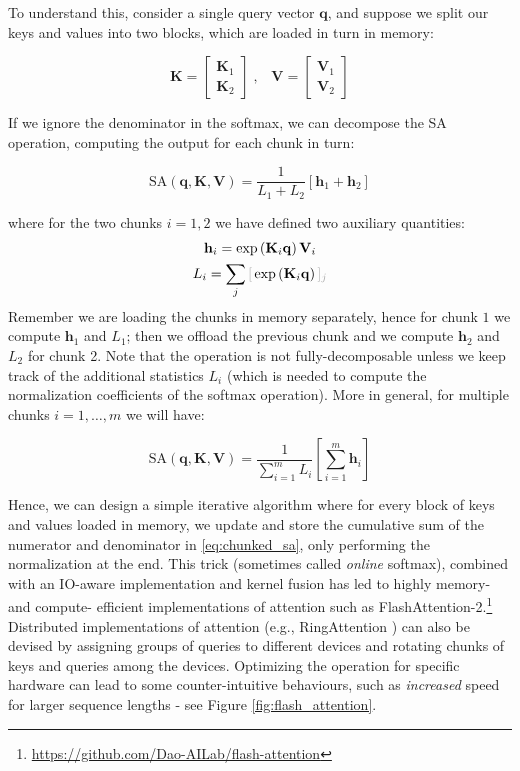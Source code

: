 To understand this, consider a single query vector $\mathbf{q}$, and suppose we split our keys and values into two blocks, which are loaded in turn in memory:

\begin{equation}
\mathbf{K} = \begin{bmatrix}\mathbf{K}_1 \\ \mathbf{K}_2 \end{bmatrix} \;,\;\;\; \mathbf{V} = \begin{bmatrix}\mathbf{V}_1 \\ \mathbf{V}_2 \end{bmatrix}
\end{equation}

If we ignore the denominator in the softmax, we can decompose the SA operation, computing the output for each chunk in turn:

\begin{equation}
\text{SA}(\mathbf{q}, \mathbf{K}, \mathbf{V}) = \frac{1}{L_1 + L_2} \left[ \mathbf{h}_1 + \mathbf{h}_2 \right]
\label{eq:attention_two_chunks}
\end{equation}

where for the two chunks $i=1,2$ we have defined two auxiliary quantities:
%
\begin{gather}
\mathbf{h}_i = \exp\left( \mathbf{K}_i\mathbf{q} \right)\mathbf{V}_i  \\
L_i = \sum_j \idx{\exp\left( \mathbf{K}_i\mathbf{q} \right)}{j}
\end{gather}
%
Remember we are loading the chunks in memory separately, hence for chunk $1$ we compute $\mathbf{h}_1$ and $L_1$; then we offload the previous chunk and we compute $\mathbf{h}_2$ and $L_2$ for chunk 2. Note that the operation is not fully-decomposable unless we keep track of the additional statistics $L_i$ (which is needed to compute the normalization coefficients of the softmax operation). More in general, for multiple chunks $i=1, \ldots, m$ we will have:

\begin{equation}
\text{SA}(\mathbf{q}, \mathbf{K}, \mathbf{V}) = \frac{1}{\sum_{i=1}^m L_i} \left[ \sum_{i=1}^m \mathbf{h}_i\right]
\label{eq:chunked_sa}
\end{equation}

Hence, we can design a simple iterative algorithm where for every block of keys and values loaded in memory, we update and store the cumulative sum of the numerator and denominator in \eqref{eq:chunked_sa}, only performing the normalization at the end. This trick (sometimes called \textit{online} softmax), combined with an IO-aware implementation and kernel fusion has led to highly memory- and compute- efficient implementations of attention such as FlashAttention-2.\footnote{\url{https://github.com/Dao-AILab/flash-attention}} Distributed implementations of attention (e.g., RingAttention \cite{liu2023ring}) can also be devised by assigning groups of queries to different devices and rotating chunks of keys and queries among the devices. Optimizing the operation for specific hardware can lead to some counter-intuitive behaviours, such as \textit{increased} speed for larger sequence lengths - see Figure \ref{fig:flash_attention}.

